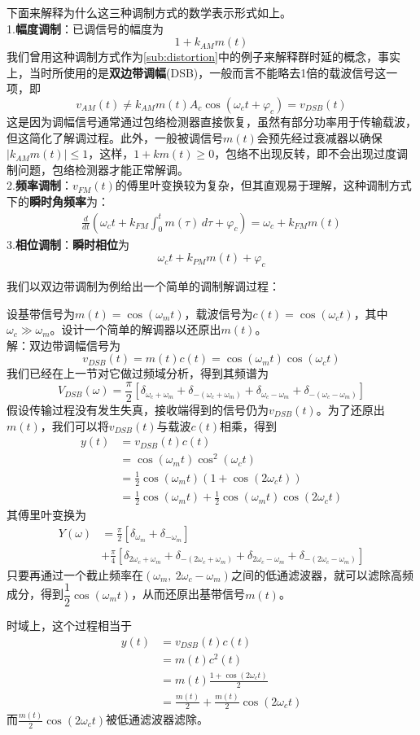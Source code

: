 \documentclass{ctexbook}
\begin{document}
下面来解释为什么这三种调制方式的数学表示形式如上。\\
1.\textbf{幅度调制}：已调信号的幅度为\[1+k_{AM}m(t)\]
我们曾用这种调制方式作为\ref{sub:distortion}中的例子来解释群时延的概念，事实上，当时所使用的是\textbf{双边带调幅}(DSB)，一般而言不能略去1倍的载波信号这一项，即
\[v_{AM}(t)\neq k_{AM} m(t)A_c \cos(\omega_c t+\varphi_c)=v_{DSB}(t)\]
这是因为调幅信号通常通过包络检测器直接恢复，虽然有部分功率用于传输载波，但这简化了解调过程。此外，一般被调信号$m(t)$会预先经过衰减器以确保$|k_{AM}m(t)|\leq 1$，这样，$1+km(t)\geq 0$，包络不出现反转，即不会出现过度调制问题，包络检测器才能正常解调。\\
2.\textbf{频率调制}：$v_{FM}(t)$的傅里叶变换较为复杂，但其直观易于理解，这种调制方式下的\textbf{瞬时角频率}为：\begin{align*}
    \frac{d}{dt}\left(\omega_c t+k_{FM}\int_{0}^{t}m(\tau)\,d\tau+\varphi_c\right)=\omega_c+k_{FM}m(t)
\end{align*}
3.\textbf{相位调制}：\textbf{瞬时相位}为\[\omega_c t+k_{PM} m(t)+\varphi_c\]

我们以双边带调制为例给出一个简单的调制解调过程：
\begin{example}
设基带信号为$m(t)=\cos(\omega_m t)$，载波信号为$c(t)=\cos(\omega_c t)$，其中$\omega_c\gg \omega_m$。设计一个简单的解调器以还原出$m(t)$。\\
解：双边带调幅信号为\[v_{DSB}(t)=m(t)c(t)=\cos(\omega_m t)\cos(\omega_c t)\]
我们已经在上一节对它做过频域分析，得到其频谱为
\[V_{DSB}(\omega)=\frac{\pi}{2}\left[\delta_{\omega_c+\omega_m}+\delta_{-(\omega_c+\omega_m)}+\delta_{\omega_c-\omega_m}+\delta_{-(\omega_c-\omega_m)}\right]\]
假设传输过程没有发生失真，接收端得到的信号仍为$v_{DSB}(t)$。为了还原出$m(t)$，我们可以将$v_{DSB}(t)$与载波$c(t)$相乘，得到
\begin{align*}
    y(t)&=v_{DSB}(t)c(t)\\
    &=\cos(\omega_m t)\cos^2(\omega_c t)\\
    &=\frac{1}{2}\cos(\omega_m t)(1+\cos(2\omega_c t))\\
    &=\frac{1}{2}\cos(\omega_m t)+\frac{1}{2}\cos(\omega_m t)\cos(2\omega_c t)
\end{align*}
其傅里叶变换为
\begin{align*}
    Y(\omega)&=\frac{\pi}{2}[\delta_{\omega_m}+\delta_{-\omega_m}]\\
    &+\frac{\pi}{4}[\delta_{2\omega_c+\omega_m}+\delta_{-(2\omega_c+\omega_m)}+\delta_{2\omega_c-\omega_m}+\delta_{-(2\omega_c-\omega_m)}]
\end{align*}
只要再通过一个截止频率在$(\omega_m,\ 2\omega_c-\omega_m)$之间的低通滤波器，就可以滤除高频成分，得到$\dfrac{1}{2}\cos(\omega_m t)$，从而还原出基带信号$m(t)$。
\end{example}
时域上，这个过程相当于\begin{align*}
    y(t)&=v_{DSB}(t)c(t)\\
    &=m(t)c^2(t)\\
    &=m(t)\frac{1+\cos(2\omega_c t)}{2}\\
    &=\frac{m(t)}{2}+\frac{m(t)}{2}\cos(2\omega_c t)
\end{align*}
而$\frac{m(t)}{2}\cos(2\omega_c t)$被低通滤波器滤除。
\end{document}
